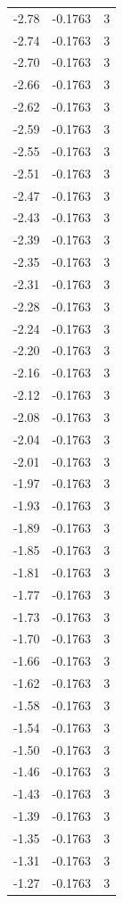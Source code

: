 \begin{longtable}{lrr}
  -2.78 & -0.1763 & 3 \\
  -2.74 & -0.1763 & 3 \\
  -2.70 & -0.1763 & 3 \\
  -2.66 & -0.1763 & 3 \\
  -2.62 & -0.1763 & 3 \\
  -2.59 & -0.1763 & 3 \\
  -2.55 & -0.1763 & 3 \\
  -2.51 & -0.1763 & 3 \\
  -2.47 & -0.1763 & 3 \\
  -2.43 & -0.1763 & 3 \\
  -2.39 & -0.1763 & 3 \\
  -2.35 & -0.1763 & 3 \\
  -2.31 & -0.1763 & 3 \\
  -2.28 & -0.1763 & 3 \\
  -2.24 & -0.1763 & 3 \\
  -2.20 & -0.1763 & 3 \\
  -2.16 & -0.1763 & 3 \\
  -2.12 & -0.1763 & 3 \\
  -2.08 & -0.1763 & 3 \\
  -2.04 & -0.1763 & 3 \\
  -2.01 & -0.1763 & 3 \\
  -1.97 & -0.1763 & 3 \\
  -1.93 & -0.1763 & 3 \\
  -1.89 & -0.1763 & 3 \\
  -1.85 & -0.1763 & 3 \\
  -1.81 & -0.1763 & 3 \\
  -1.77 & -0.1763 & 3 \\
  -1.73 & -0.1763 & 3 \\
  -1.70 & -0.1763 & 3 \\
  -1.66 & -0.1763 & 3 \\
  -1.62 & -0.1763 & 3 \\
  -1.58 & -0.1763 & 3 \\
  -1.54 & -0.1763 & 3 \\
  -1.50 & -0.1763 & 3 \\
  -1.46 & -0.1763 & 3 \\
  -1.43 & -0.1763 & 3 \\
  -1.39 & -0.1763 & 3 \\
  -1.35 & -0.1763 & 3 \\
  -1.31 & -0.1763 & 3 \\
  -1.27 & -0.1763 & 3 \\

\end{longtable}
